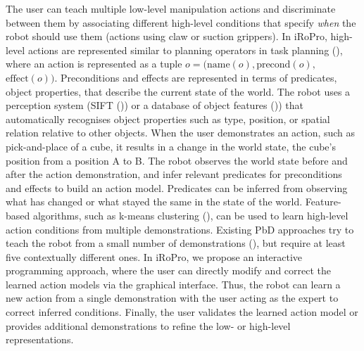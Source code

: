 The user can teach multiple low-level manipulation actions and discriminate between them by associating different high-level conditions that specify \textit{when} the robot should use them (\eg actions using claw or suction grippers).
In iRoPro, high-level actions are represented similar to planning operators in task planning (), where an action is represented as a tuple $o = (\text{name}(o), \text{precond}(o),$ $\text{effect}(o))$.
Preconditions and effects are represented in terms of predicates, \eg object properties, that describe the current state of the world.
The robot uses a perception system (\eg SIFT (\cite{ahmadzadeh2015learning})) or a database of object features (\cite{mason2011robot})) that automatically recognises object properties such as type, position, or spatial relation relative to other objects.
When the user demonstrates an action, such as pick-and-place of a cube, %
it results in a change in the world state, \eg the cube's position from a position A to B.
The robot observes the world state before and after the action demonstration, and infer relevant predicates for preconditions and effects to build an action model. %
Predicates can be inferred from observing what has changed or what stayed the same in the state of the world.
Feature-based algorithms, such as k-means clustering (\cite{mollard2015robot,abdo2013learning}), can be used to learn high-level action conditions from multiple demonstrations.
Existing PbD approaches try to teach the robot from a small number of demonstrations (\cite{orendt2016robot,abdo2013learning}), but require at least five contextually different ones.
In iRoPro, we propose an interactive programming approach, where the user can directly modify and correct the learned action models via the graphical interface.
Thus, the robot can learn a new action from a single demonstration with the user acting as the expert to correct inferred conditions.
Finally, the user validates the learned action model or provides additional demonstrations to refine the low- or high-level representations.

